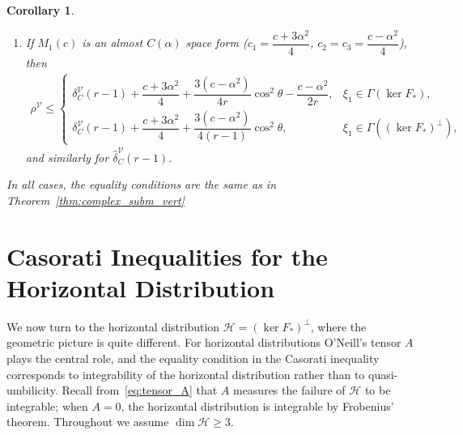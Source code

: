 \documentclass[11pt]{amsart}
\theoremstyle{plain}
\newtheorem{corollary}{Corollary}[section]
\theoremstyle{definition}
\theoremstyle{remark}
\newcommand{\calH}{\mathcal{H}}
\begin{document}
\begin{corollary}
\begin{enumerate}
    \item If $M_1(c)$ is an almost $C(\alpha)$ space form 
    ($c_1=\dfrac{c+3\alpha^2}{4}$, 
    $c_2=c_3=\dfrac{c-\alpha^2}{4}$), then
    \begin{align*}
    \rho^{\mathcal{V}} \le 
    \begin{cases}
    \delta_C^{\mathcal{V}}(r-1) + \dfrac{c+3\alpha^2}{4} 
    + \dfrac{3(c-\alpha^2)}{4r}\cos^2\theta 
    - \dfrac{c-\alpha^2}{2r}, 
    & \xi_1 \in \Gamma(\ker F_*),\\[8pt]
    \delta_C^{\mathcal{V}}(r-1) + \dfrac{c+3\alpha^2}{4} 
    + \dfrac{3(c-\alpha^2)}{4(r-1)}\cos^2\theta,
    & \xi_1 \in \Gamma((\ker F_*)^{\perp}),
    \end{cases}
    \end{align*}
    and similarly for $\hat{\delta}_C^{\mathcal{V}}(r-1)$.
\end{enumerate}
In all cases, the equality conditions are the same as in 
Theorem~\ref{thm:complex_subm_vert}
\end{corollary}


\section{Casorati Inequalities for the Horizontal Distribution}\label{sec:horizontal}

We now turn to the horizontal distribution $\calH=(\ker F_*)^{\perp}$, where the
geometric picture is quite different. For horizontal distributions O'Neill's
tensor $A$ plays the central role, and the equality condition in the Casorati
inequality corresponds to integrability of the horizontal distribution rather
than to quasi-umbilicity. Recall from~\eqref{eq:tensor_A} that $A$ measures the
failure of $\calH$ to be integrable; when $A=0$, the horizontal distribution is
integrable by Frobenius' theorem. Throughout we assume $\dim\calH\geq 3$.
\end{document}

